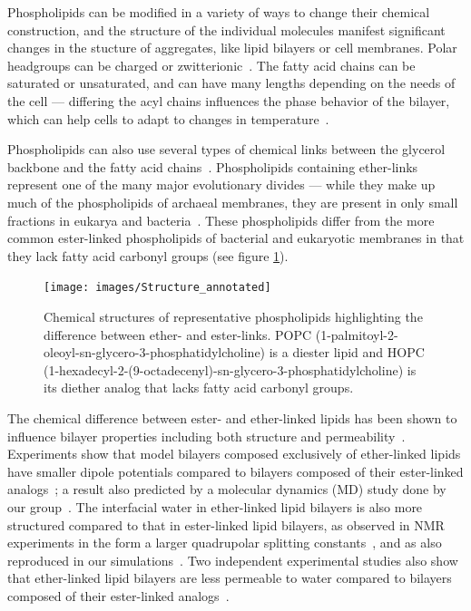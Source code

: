 \documentclass[12pt,openany,final]{book}
\begin{document}
Phospholipids can be modified in a variety of ways to change their chemical construction,
and the structure of the individual molecules manifest significant changes
in the stucture of aggregates, like lipid bilayers or cell membranes.
Polar headgroups can be charged or zwitterionic~\cite{israelachvili:2011:intermol}. The fatty acid chains can be saturated or unsaturated, 
and can have many lengths depending 
on the needs of the cell --- differing the acyl chains influences the 
phase behavior of the bilayer, which can help cells to adapt to changes in
temperature~\cite{ashrafuzzaman:2012:membrane,zhang:2008:memhomeo}.

Phospholipids can also use several types of chemical links between the glycerol
backbone and the fatty acid chains~\cite{sehgal:1962, koga:2014}.
Phospholipids containing ether-links represent one of the many major evolutionary divides --- 
while they make up much of the phospholipids of archaeal membranes,
 they are present in only small fractions in eukarya and bacteria~\cite{sehgal:1962, koga:2014, kates:1993:archealipids}. 
These phospholipids differ from the more common ester-linked phospholipids of bacterial and 
eukaryotic membranes in that they lack fatty acid carbonyl groups (see figure \ref{fig:struc}). 

\begin{figure}[htp]
\caption[Chemical structures of representative phospholipids highlighting the difference
between ether- and ester-links.]{ 
Chemical structures of representative phospholipids highlighting the difference 
between ether- and ester-links. POPC (1-palmitoyl-2-oleoyl-sn-glycero-3-phosphatidylcholine) is a 
diester lipid and HOPC (1-hexadecyl-2-(9-octadecenyl)-sn-glycero-3-phosphatidylcholine) is its diether analog that lacks fatty acid carbonyl groups.
}
\label{fig:struc}
\texttt{[image: images/Structure\_annotated]}
\end{figure}

The chemical difference between ester- and ether-linked lipids has been shown to influence 
bilayer properties including both structure and permeability~\cite{guler:2009,jansen:1995, gawrisch:1992,haas:1990,fogarty:2015,kruczek:2017:ether}. 
Experiments show that model bilayers composed exclusively of ether-linked lipids have smaller dipole potentials compared to 
bilayers composed of their ester-linked analogs~\cite{gawrisch:1992}; a result also predicted by a molecular dynamics (MD) 
study done by our group~\cite{kruczek:2017:ether}. The interfacial water in ether-linked lipid bilayers is also more structured compared to that 
in ester-linked lipid bilayers, as observed in NMR experiments in the form a larger quadrupolar splitting constants~\cite{gawrisch:1992}, and as 
also reproduced in our simulations~\cite{kruczek:2017:ether}. Two independent experimental studies also show 
that ether-linked lipid bilayers are less permeable to water compared to bilayers composed of their ester-linked 
analogs~\cite{jansen:1995, guler:2009}. 
\end{document}
